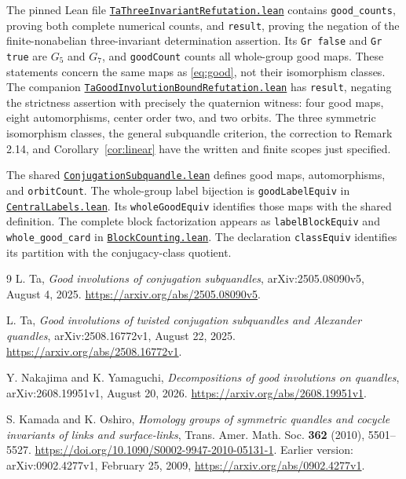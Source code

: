 \documentclass[11pt]{article}
\begin{document}
The pinned Lean file
\href{https://github.com/the-omega-institute/trureturing/blob/d9880e9f2c329bb3db982f33791419d5d90126b9/D5/S3/FiniteGroups/Quandles/TaThreeInvariantRefutation.lean}{\texttt{TaThreeInvariantRefutation.lean}}
contains \texttt{good\_counts}, proving both complete numerical counts,
and \texttt{result}, proving the negation of the finite-nonabelian
three-invariant determination assertion. Its \texttt{Gr false} and
\texttt{Gr true} are $G_5$ and $G_7$, and \texttt{goodCount} counts
all whole-group good maps. These statements concern the same maps as
\eqref{eq:good}, not their isomorphism classes. The companion
\href{https://github.com/the-omega-institute/trureturing/blob/d9880e9f2c329bb3db982f33791419d5d90126b9/D5/S3/FiniteGroups/Quandles/TaGoodInvolutionBoundRefutation.lean}{\texttt{TaGoodInvolutionBoundRefutation.lean}}
has \texttt{result}, negating the strictness assertion with precisely
the quaternion witness: four good maps, eight automorphisms, center
order two, and two orbits. The three symmetric isomorphism classes,
the general subquandle criterion, the correction to Remark 2.14,
and Corollary~\ref{cor:linear}
have the written and finite scopes just specified.

The shared
\href{https://github.com/the-omega-institute/trureturing/blob/d9880e9f2c329bb3db982f33791419d5d90126b9/D5/S3/FiniteGroups/Quandles/ConjugationSubquandle.lean}{\texttt{ConjugationSubquandle.lean}}
defines good maps, automorphisms, and \texttt{orbitCount}.
The whole-group label bijection is \texttt{goodLabelEquiv} in
\href{https://github.com/the-omega-institute/trureturing/blob/d9880e9f2c329bb3db982f33791419d5d90126b9/D5/S3/FiniteGroups/Quandles/CentralLabels.lean}{\texttt{CentralLabels.lean}}.
Its \texttt{wholeGoodEquiv} identifies those maps with the shared definition.
The complete block factorization appears as \texttt{labelBlockEquiv}
and \texttt{whole\_good\_card} in
\href{https://github.com/the-omega-institute/trureturing/blob/d9880e9f2c329bb3db982f33791419d5d90126b9/D5/S3/FiniteGroups/Quandles/BlockCounting.lean}{\texttt{BlockCounting.lean}}.
The declaration \texttt{classEquiv} identifies its partition with the
conjugacy-class quotient.

\begin{thebibliography}{9}\small
{}
L. Ta, \emph{Good involutions of conjugation subquandles},
arXiv:2505.08090v5, August 4, 2025.
\url{https://arxiv.org/abs/2505.08090v5}.

L. Ta, \emph{Good involutions of twisted conjugation subquandles and
Alexander quandles}, arXiv:2508.16772v1, August 22, 2025.
\url{https://arxiv.org/abs/2508.16772v1}.

Y. Nakajima and K. Yamaguchi, \emph{Decompositions of good involutions on
quandles}, arXiv:2608.19951v1, August 20, 2026.
\url{https://arxiv.org/abs/2608.19951v1}.

S. Kamada and K. Oshiro, \emph{Homology groups of symmetric quandles
and cocycle invariants of links and surface-links},
Trans. Amer. Math. Soc. \textbf{362} (2010), 5501--5527.
\url{https://doi.org/10.1090/S0002-9947-2010-05131-1}.
Earlier version: arXiv:0902.4277v1, February 25, 2009,
\url{https://arxiv.org/abs/0902.4277v1}.
\end{thebibliography}
\end{document}

